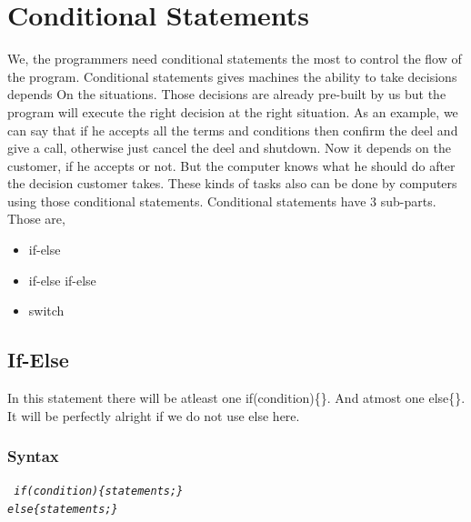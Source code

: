 \documentclass[A4 paper,openany]{book}  %
\begin{document}
\section{Conditional Statements}
We, the programmers need conditional statements the most to control the flow of the program. Conditional statements gives machines the ability to take decisions depends On
the situations. Those decisions are already pre-built by us but the program will execute the right decision at the right situation. As an example, we can say that if he accepts
all the terms and conditions then confirm the deel and give a call, otherwise just cancel the deel and shutdown. Now it depends on the customer, if he accepts or not.
But the computer knows what he should do after the decision customer takes. These kinds of tasks also can be done by computers using those conditional
statements. Conditional statements have 3 sub-parts. Those are,
\begin{itemize}
    \item if-else
    \item if-else if-else
    \item switch
\end{itemize}
% 
% 
\subsection{If-Else}
In this statement there will be atleast one if(condition)\{\}. And atmost one else\{\}. It will be perfectly alright if we do not use else here.
% 
% 
\subsubsection{Syntax}
\begin{center}
    \tt{
        \textit{if(condition)\{statements;\}\\else\{statements;\}}
    }
\end{center}

\newpage

% 
% 
\end{document}
